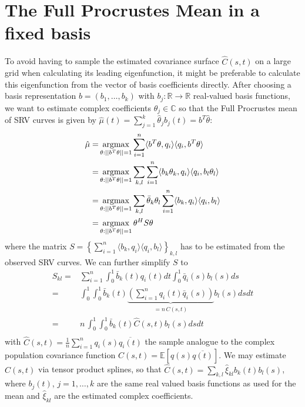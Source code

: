 \section{The Full Procrustes Mean in a fixed basis}
To avoid having to sample the estimated covariance surface $\hat{C}(s,t)$ on a large grid when calculating its leading eigenfunction, it might be preferable to calculate this eigenfunction from the vector of basis coefficients directly.
After choosing a basis representation $b = (b_1, \dots, b_k)$ with $b_j : \mathbb{R} \rightarrow \mathbb{R}$ real-valued basis functions, we want to estimate complex coefficients $\theta_j \in \mathbb{C}$ so that the Full Procrustes mean of SRV curves is given by $\hat{\mu}(t) = \sum_{j=1}^k \hat{\theta}_j b_j(t) = b^T \hat{\theta}$:
\begin{align*}
    \hat{\mu} =& \operatorname*{argmax}_{\theta : ||b^T\theta||=1} \sum_{i=1}^n \langle b^T\theta, q_i \rangle \langle q_i, b^T\theta \rangle \\
    =& \operatorname*{argmax}_{\theta : ||b^T\theta||=1} \sum_{k,l} \sum_{i=1}^n \langle b_k \theta_k, q_i \rangle \langle q_i, b_l \theta_l \rangle \\
    =& \operatorname*{argmax}_{\theta : ||b^T\theta||=1} \sum_{k,l} \bar{\theta}_k \theta_l \sum_{i=1}^n \langle b_k, q_i \rangle \langle q_i, b_l \rangle \\
    =& \operatorname*{argmax}_{\theta : ||b^T\theta||=1} \theta^H S \theta \\
\end{align*}
where the matrix $S = \left\{ \sum_{i=1}^n \langle b_k, q_i \rangle \langle q_i, b_l \rangle \right\}_{k,l}$ has to be estimated from the observed SRV curves.
We can further simplify $S$ to
\begin{align*}
    S_{kl} =& \sum_{i=1}^n \int_0^1 \bar{b}_k(t) q_i(t) dt \int_0^1 \bar{q}_i(s) b_l(s) ds \\
    =& \int_0^1 \int_0^1 \bar{b}_k(t) \underbrace{\left( \sum_{i=1}^n q_i(t) \bar{q}_i(s) \right)}_{= n \, \hat{C}(s,t)} b_l(s) ds dt\\
    =& n \, \int_0^1 \int_0^1 \bar{b}_k(t) \hat{C}(s,t) b_l(s) ds dt\\
\end{align*}
with $\hat{C}(s,t) = \frac{1}{n} \sum_{i=1}^n q_i(s) \overline{q_i(t)}$ the sample analogue to the complex population covariance function $C(s,t) = \mathbb{E}[q(s)\overline{q(t)}]$.
We may estimate $C(s,t)$ via tensor product splines, so that $\hat{C}(s,t) = \sum_{k,l} \hat{\xi}_{kl} b_k(t) b_l(s)$, where $b_j(t)$, $j=1,\dots,k$ are the same real valued basis functions as used for the mean and $\hat{\xi}_{kl}$ are the estimated complex coefficients.
